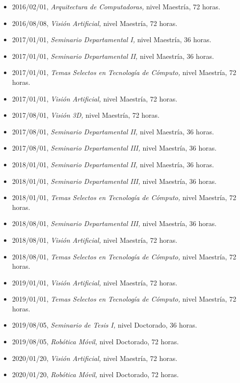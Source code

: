 \begin{itemize} 
\item 2016/02/01, \textit{ Arquitectura de Computadoras,} nivel Maestría, 72 horas. 
\item 2016/08/08, \textit{ Visión Artificial,} nivel Maestría, 72 horas. 
\item 2017/01/01, \textit{ Seminario Departamental I,} nivel Maestría, 36 horas. 
\item 2017/01/01, \textit{ Seminario Departamental II,} nivel Maestría, 36 horas. 
\item 2017/01/01, \textit{ Temas Selectos en Tecnología de Cómputo,} nivel Maestría, 72 horas. 
\item 2017/01/01, \textit{ Visión Artificial,} nivel Maestría, 72 horas. 
\item 2017/08/01, \textit{ Visión 3D,} nivel Maestría, 72 horas. 
\item 2017/08/01, \textit{ Seminario Departamental II,} nivel Maestría, 36 horas. 
\item 2017/08/01, \textit{ Seminario Departamental III,} nivel Maestría, 36 horas. 
\item 2018/01/01, \textit{ Seminario Departamental II,} nivel Maestría, 36 horas. 
\item 2018/01/01, \textit{ Seminario Departamental III,} nivel Maestría, 36 horas. 
\item 2018/01/01, \textit{ Temas Selectos en Tecnología de Cómputo,} nivel Maestría, 72 horas. 
\item 2018/08/01, \textit{ Seminario Departamental III,} nivel Maestría, 36 horas. 
\item 2018/08/01, \textit{ Visión Artificial,} nivel Maestría, 72 horas. 
\item 2018/08/01, \textit{ Temas Selectos en Tecnología de Cómputo,} nivel Maestría, 72 horas. 
\item 2019/01/01, \textit{ Visión Artificial,} nivel Maestría, 72 horas. 
\item 2019/01/01, \textit{ Temas Selectos en Tecnología de Cómputo,} nivel Maestría, 72 horas. 
\item 2019/08/05, \textit{ Seminario de Tesis I,} nivel Doctorado, 36 horas. 
\item 2019/08/05, \textit{ Robótica Móvil,} nivel Doctorado, 72 horas. 
\item 2020/01/20, \textit{ Visión Artificial,} nivel Maestría, 72 horas. 
\item 2020/01/20, \textit{ Robótica Móvil,} nivel Doctorado, 72 horas. 

\end{itemize}
